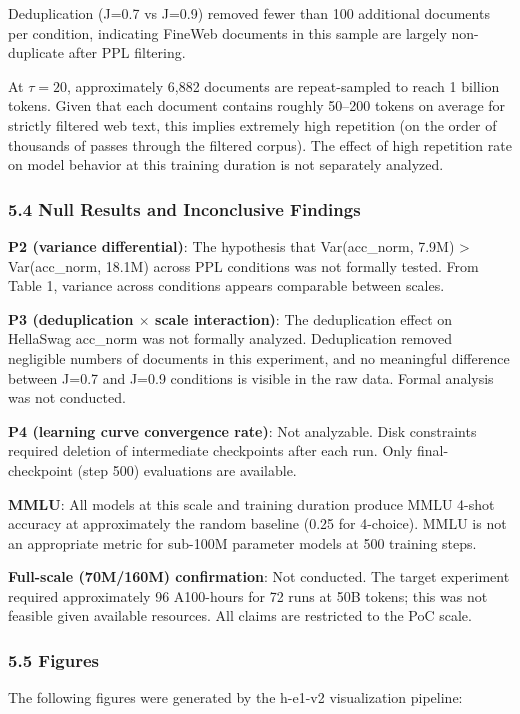 Deduplication (J=0.7 vs J=0.9) removed fewer than 100 additional documents per condition, indicating FineWeb documents in this sample are largely non-duplicate after PPL filtering.

At $\tau =20$, approximately 6,882 documents are repeat-sampled to reach 1 billion tokens. Given that each document contains roughly 50--200 tokens on average for strictly filtered web text, this implies extremely high repetition (on the order of thousands of passes through the filtered corpus). The effect of high repetition rate on model behavior at this training duration is not separately analyzed.

\subsubsection{5.4 Null Results and Inconclusive Findings}

\textbf{P2 (variance differential)}: The hypothesis that Var(acc\_norm, 7.9M) > Var(acc\_norm, 18.1M) across PPL conditions was not formally tested. From Table 1, variance across conditions appears comparable between scales.

\textbf{P3 (deduplication $\times$ scale interaction)}: The deduplication effect on HellaSwag acc\_norm was not formally analyzed. Deduplication removed negligible numbers of documents in this experiment, and no meaningful difference between J=0.7 and J=0.9 conditions is visible in the raw data. Formal analysis was not conducted.

\textbf{P4 (learning curve convergence rate)}: Not analyzable. Disk constraints required deletion of intermediate checkpoints after each run. Only final-checkpoint (step 500) evaluations are available.

\textbf{MMLU}: All models at this scale and training duration produce MMLU 4-shot accuracy at approximately the random baseline (0.25 for 4-choice). MMLU is not an appropriate metric for sub-100M parameter models at 500 training steps.

\textbf{Full-scale (70M/160M) confirmation}: Not conducted. The target experiment required approximately 96 A100-hours for 72 runs at 50B tokens; this was not feasible given available resources. All claims are restricted to the PoC scale.

\subsubsection{5.5 Figures}

The following figures were generated by the h-e1-v2 visualization pipeline:

